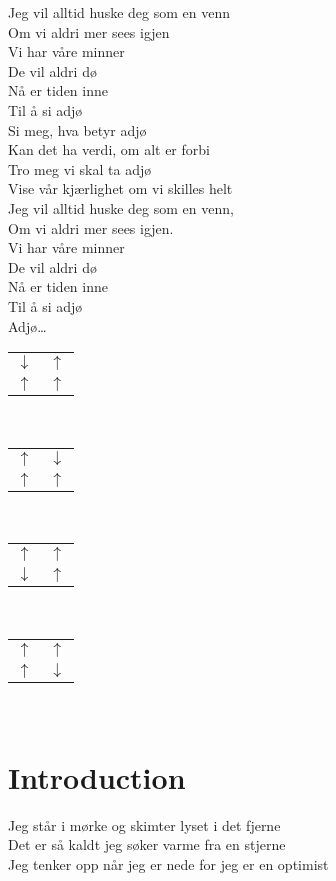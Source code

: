 \documentclass{article}
\begin{document}
\noindent Jeg vil alltid huske deg som en venn\\
Om vi aldri mer sees igjen\\
Vi har våre minner\\
De vil aldri dø\\
Nå er tiden inne\\
Til å si adjø\\


\noindent Si meg, hva betyr adjø\\
Kan det ha verdi, om alt er forbi\\
Tro meg vi skal ta adjø\\
Vise vår kjærlighet om vi skilles helt\\
Jeg vil alltid huske deg som en venn,\\
Om vi aldri mer sees igjen.\\


\noindent Vi har våre minner\\
De vil aldri dø\\
Nå er tiden inne\\
Til å si adjø\\
Adjø…\\


\begin{tabular}{c c}
  $\downarrow$ & $\uparrow$\\
  $\uparrow$ & $\uparrow$
\end{tabular}\\

\begin{tabular}{c c}
  $\uparrow$ & $\downarrow$\\
  $\uparrow$ & $\uparrow$
\end{tabular}\\

\begin{tabular}{c c}
  $\uparrow$ & $\uparrow$\\
  $\downarrow$ & $\uparrow$
\end{tabular}\\

\begin{tabular}{c c}
  $\uparrow$ & $\uparrow$\\
  $\uparrow$ & $\downarrow$
\end{tabular}\\

\section*{Introduction}
Jeg står i mørke og skimter lyset i det fjerne\\
Det er så kaldt jeg søker varme fra en stjerne\\
Jeg tenker opp når jeg er nede for jeg er en optimist\\
\end{document}

